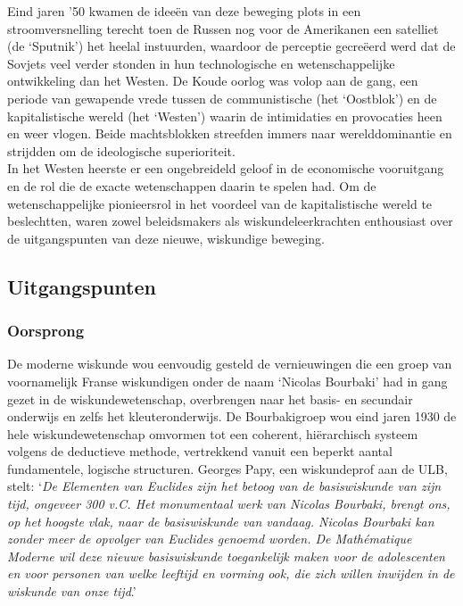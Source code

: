 \documentclass[a4paper,11pt]{article}
\begin{document}
\noindent Eind jaren '50 kwamen de 
ideeën van deze beweging plots in een stroomversnelling terecht toen de Russen 
nog voor de Amerikanen een satelliet (de `Sputnik') het heelal instuurden, 
waardoor de perceptie gecreëerd werd dat de Sovjets veel verder stonden in hun 
technologische en wetenschappelijke ontwikkeling dan het Westen. De Koude oorlog 
was volop aan de gang, een periode van gewapende vrede tussen de communistische (het `Oostblok') 
en de kapitalistische wereld (het `Westen') waarin de intimidaties en provocaties heen en weer vlogen.
Beide machtsblokken streefden immers naar werelddominantie en strijdden om de ideologische superioriteit.\\

\noindent In het Westen heerste er een ongebreideld geloof in de economische vooruitgang 
en de rol die de exacte wetenschappen daarin te spelen had. Om de 
wetenschappelijke pionieersrol in het voordeel van de kapitalistische wereld te beslechtten, waren zowel beleidsmakers als 
wiskundeleerkrachten enthousiast over de uitgangspunten van deze nieuwe, wiskundige beweging.

\subsection{Uitgangspunten}
\subsubsection{Oorsprong}
De moderne wiskunde wou eenvoudig gesteld de vernieuwingen die een groep van voornamelijk
Franse wiskundigen onder de 
naam `Nicolas Bourbaki' had in gang gezet in de wiskundewetenschap, overbrengen 
naar het basis- en secundair onderwijs en zelfs het kleuteronderwijs. De Bourbakigroep wou eind jaren 1930 de hele
wiskundewetenschap omvormen tot een coherent, hiërarchisch systeem volgens de 
deductieve methode, vertrekkend vanuit een beperkt aantal fundamentele, logische 
structuren. Georges Papy, een wiskundeprof aan de ULB, stelt: `\textit{De Elementen van 
Euclides zijn het betoog van de basiswiskunde van zijn tijd, ongeveer 300 v.C. 
Het monumentaal werk van Nicolas Bourbaki, brengt ons, op het hoogste vlak, naar de 
basiswiskunde van vandaag. Nicolas Bourbaki kan zonder meer de opvolger van Euclides genoemd worden. De Mathématique Moderne wil deze nieuwe basiswiskunde toegankelijk maken voor de adolescenten en voor personen van welke 
leeftijd en vorming ook, die zich willen inwijden in de wiskunde van onze tijd}.' \\
\end{document}

